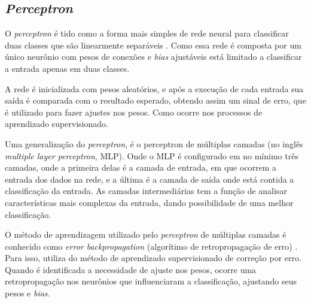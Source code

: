 \subsection{\textit{Perceptron}}
O \textit{perceptron} é tido como a forma mais simples de rede neural para classificar duas classes que são linearmente separáveis \cite{haykin2001}. Como essa rede é composta por um único neurônio com pesos de conexões e \textit{bias} ajustáveis está limitado a classificar a entrada apenas em duas classes. 
\par A rede é inicializada com pesos aleatórios, e após a execução de cada entrada sua saída é comparada com o resultado esperado, obtendo assim um sinal de erro, que é utilizado para fazer ajustes nos pesos. Como ocorre nos processos de aprendizado supervisionado.
\par Uma generalização do \textit{perceptron}, é o perceptron de múltiplas camadas (no inglês \textit{multiple layer perceptron}, MLP). Onde o MLP é configurado em no mínimo três camadas, onde a primeira delas é a camada de entrada, em que ocorrem a entrada dos dados na rede, e a última é a camada de saída onde está contida a classificação da entrada. As camadas intermediárias tem a função de analisar características mais complexas da entrada, dando possibilidade de uma melhor classificação.
\par O método de aprendizagem utilizado pelo \textit{perceptron} de múltiplas camadas é conhecido como \textit{error backpropagation} (algorítimo de retropropagação de erro) \cite{haykin2001}. Para isso, utiliza do método de aprendizado supervisionado de correção por erro. Quando é identificada a necessidade de ajuste nos pesos, ocorre uma 
retropropagação nos neurônios que influenciaram a classificação, ajustando seus pesos 
e \textit{bias}.
